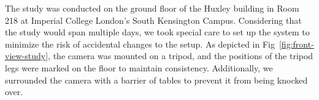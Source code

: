 The study was conducted on the ground floor of the Huxley building in Room 218 at Imperial College London's South Kensington Campus. Considering that the study would span multiple days, we took special care to set up the system to minimize the risk of accidental changes to the setup. As depicted in Fig~\ref{fig:front-view-study}, the camera was mounted on a tripod, and the positions of the tripod legs were marked on the floor to maintain consistency. Additionally, we surrounded the camera with a barrier of tables to prevent it from being knocked over.

\begin{invisBox}
	\hfill
\end{invisBox}

